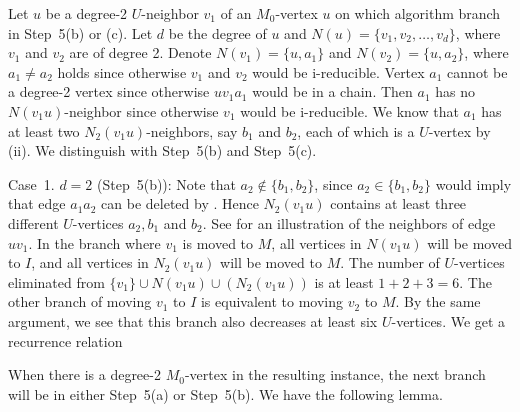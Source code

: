 \documentclass{elsart_TR2}
\begin{document}
Let $u$ be  a degree-2 $U$-neighbor $v_1$ of an $M_0$-vertex $u$
on which algorithm  branch in Step~5(b) or (c).
Let  $d$ be the degree of $u$ and $N(u)=\{v_1,v_2,\ldots,v_d\}$, where $v_1$ and $v_2$ are of degree 2.
Denote $N(v_1)=\{u,a_1\}$ and $N(v_2)=\{u,a_2\}$, where $a_1\neq a_2$ holds
since otherwise $v_1$ and $v_2$ would be i-reducible.
 Vertex $a_1$ cannot be a degree-2 vertex since otherwise $uv_1a_1$ would be in a chain.
Then $a_1$  has no $N(v_1u)$-neighbor since otherwise $v_1$ would be i-reducible.
 We know that $a_1$ has at least two  $N_2(v_1u)$-neighbors, say  $b_1$ and $b_2$, each of which
 is a $U$-vertex by (ii).
We distinguish with Step~5(b) and Step~5(c).




Case~1. $d=2$ (Step~5(b)):
Note that $a_2\not\in\{ b_1,b_2\}$, since  $a_2 \in\{ b_1,b_2\}$ would imply
that  edge $a_1a_2$ can be deleted by .
Hence $N_2(v_1u)$ contains at least three different $U$-vertices $a_2, b_1$ and $b_2$.
See  for an illustration of  the neighbors of edge $uv_1$.
In the branch where $v_1$ is moved to $M$,   all vertices in $N(v_1u)$ will be moved to $I$,
 and all vertices in  $N_2(v_1u)$ will be moved to $M$.
The number of  $U$-vertices  eliminated from $\{v_1\}\cup N(v_1u) \cup (N_2(v_1u))$ is at least $1+2+3=6$.
The other branch of moving $v_1$ to $I$ is equivalent to moving $v_2$ to $M$.
By the same argument, we see that this branch  also decreases at least six $U$-vertices.
We get a recurrence relation

\vspace{-0mm}\vspace{-0mm}

When there is a degree-2 $M_0$-vertex   in the resulting instance,
 the next branch will be in either Step~5(a) or Step~5(b). We have the following lemma.


\end{document}
